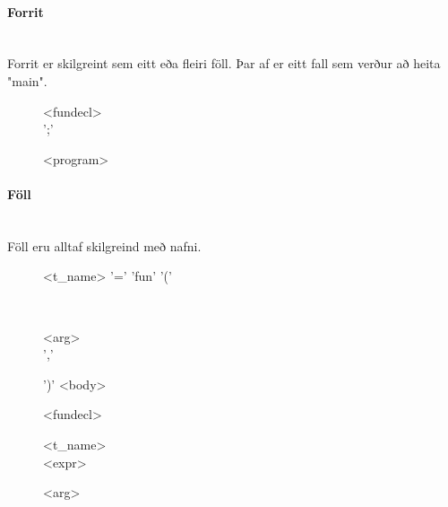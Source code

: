 \documentclass{article}
\begin{document}
\paragraph{Forrit} ~\\

Forrit er skilgreint sem eitt eða fleiri föll. Þar af er eitt fall sem verður að heita "main".

\begin{figure}[h!]
	\begin{syntdiag}
	\begin{rep} 
		<fundecl> \\ ';'
	\end{rep} 
	\end{syntdiag}
	\caption{{\textless}program{\textgreater}}
\end{figure}

\clearpage
\paragraph{Föll} ~\\

Föll eru alltaf skilgreind með nafni.

\begin{figure}[h!]
	\begin{syntdiag}
	<t_name> '=' 'fun' '('
	\begin{stack} \\
		\begin{rep} 
			<arg> \\ ','
		\end{rep} 
	\end{stack} 
	')' <body>
	\end{syntdiag}
	\caption{{\textless}fundecl{\textgreater}}
\end{figure}


\begin{figure}[h!]
	\begin{syntdiag}
	\begin{stack}
		<t_name> \\
		<expr>
	\end{stack} 
	\end{syntdiag}
	\caption{{\textless}arg{\textgreater}}
\end{figure}
\end{document}
